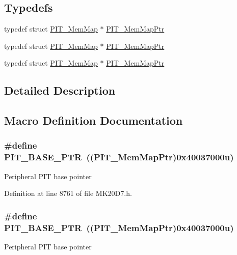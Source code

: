 \subsection*{Typedefs}
\begin{DoxyCompactItemize}
\item 
typedef struct \hyperlink{struct_p_i_t___mem_map}{P\+I\+T\+\_\+\+Mem\+Map} $\ast$ \hyperlink{group___p_i_t___peripheral_ga4efe9d2676c775562cb282254af9a937}{P\+I\+T\+\_\+\+Mem\+Map\+Ptr}
\item 
typedef struct \hyperlink{struct_p_i_t___mem_map}{P\+I\+T\+\_\+\+Mem\+Map} $\ast$ \hyperlink{group___p_i_t___peripheral_ga4efe9d2676c775562cb282254af9a937}{P\+I\+T\+\_\+\+Mem\+Map\+Ptr}
\item 
typedef struct \hyperlink{struct_p_i_t___mem_map}{P\+I\+T\+\_\+\+Mem\+Map} $\ast$ \hyperlink{group___p_i_t___peripheral_ga4efe9d2676c775562cb282254af9a937}{P\+I\+T\+\_\+\+Mem\+Map\+Ptr}
\end{DoxyCompactItemize}


\subsection{Detailed Description}


\subsection{Macro Definition Documentation}
\subsubsection[{\texorpdfstring{P\+I\+T\+\_\+\+B\+A\+S\+E\+\_\+\+P\+TR}{PIT_BASE_PTR}}]{\setlength{\rightskip}{0pt plus 5cm}\#define P\+I\+T\+\_\+\+B\+A\+S\+E\+\_\+\+P\+TR~(({\bf P\+I\+T\+\_\+\+Mem\+Map\+Ptr})0x40037000u)}\hypertarget{group___p_i_t___peripheral_ga70be45f58402a8e6d2ce4df7b23aa41c}{}\label{group___p_i_t___peripheral_ga70be45f58402a8e6d2ce4df7b23aa41c}
Peripheral P\+IT base pointer 

Definition at line 8761 of file M\+K20\+D7.\+h.

\subsubsection[{\texorpdfstring{P\+I\+T\+\_\+\+B\+A\+S\+E\+\_\+\+P\+TR}{PIT_BASE_PTR}}]{\setlength{\rightskip}{0pt plus 5cm}\#define P\+I\+T\+\_\+\+B\+A\+S\+E\+\_\+\+P\+TR~(({\bf P\+I\+T\+\_\+\+Mem\+Map\+Ptr})0x40037000u)}\hypertarget{group___p_i_t___peripheral_ga70be45f58402a8e6d2ce4df7b23aa41c}{}\label{group___p_i_t___peripheral_ga70be45f58402a8e6d2ce4df7b23aa41c}
Peripheral P\+IT base pointer 

